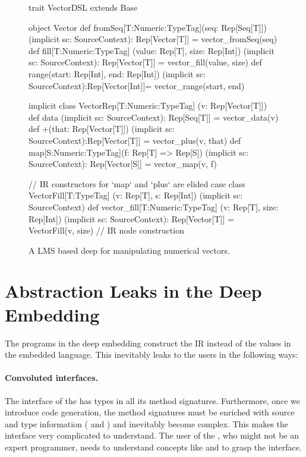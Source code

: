 \begin{figure}
\begin{listingtiny}
trait VectorDSL extends Base {
  object Vector {
    def fromSeq[T:Numeric:TypeTag](seq: Rep[Seq[T]])
      (implicit sc: SourceContext): Rep[Vector[T]] =
      vector_fromSeq(seq)
    def fill[T:Numeric:TypeTag]
      (value: Rep[T], size: Rep[Int])
      (implicit sc: SourceContext): Rep[Vector[T]] =
      vector_fill(value, size)
    def range(start: Rep[Int], end: Rep[Int])
      (implicit sc: SourceContext):Rep[Vector[Int]]=
      vector_range(start, end)
  }

  implicit class VectorRep[T:Numeric:TypeTag]
    (v: Rep[Vector[T]]) {
    def data
      (implicit sc: SourceContext): Rep[Seq[T]] =
      vector_data(v)
    def +(that: Rep[Vector[T]])
      (implicit sc: SourceContext):Rep[Vector[T]] =
      vector_plus(v, that)
    def map[S:Numeric:TypeTag](f: Rep[T] => Rep[S])
      (implicit sc: SourceContext): Rep[Vector[S]] =
      vector_map(v, f)
  }

  // IR constructors for `map` and `plus` are elided
  case class VectorFill[T:TypeTag]
    (v: Rep[T], s: Rep[Int])
    (implicit sc: SourceContext)
  def vector_fill[T:Numeric:TypeTag]
    (v: Rep[T], size: Rep[Int])
    (implicit sc: SourceContext): Rep[Vector[T]] =
    VectorFill(v, size) // IR node construction
}
\end{listingtiny}
\caption{\label{lst:vector_deep} A LMS based deep \edsl{} for manipulating numerical vectors.}
\end{figure}

\section{Abstraction Leaks in the Deep Embedding}
\label{sec:abstraction-leaks}

The programs in the deep embedding construct the IR instead of the values in the embedded language. This inevitably leaks to the users in the following ways:

\paragraph{Convoluted interfaces.} The interface of the \edsl has 
types in all its method signatures. Furthermore, once we introduce code
generation, the method signatures must be enriched with source and type
information ( and ) and inevitably become
complex. This makes the interface very complicated to understand. The user of
the \edsl{}, who might not be an expert programmer, needs to understand concepts
like  and  to grasp the interface.

